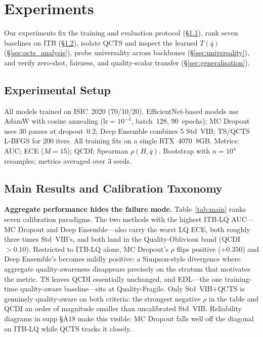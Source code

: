 \documentclass{bmvc2k}
\newcommand{\qbar}{\bar{q}}
\begin{document}
\section{Experiments}
\label{sec:experiments}

Our experiments fix the training and evaluation protocol (\S\ref{sec:setup}), rank seven baselines on ITB (\S\ref{sec:main_results}), isolate QCTS and inspect the learned $T(\qbar)$ (\S\ref{sec:qcts_analysis}), probe universality across backbones (\S\ref{sec:universality}), and verify zero-shot, fairness, and quality-scalar transfer (\S\ref{sec:generalisation}).

\subsection{Experimental Setup}
\label{sec:setup}

All models trained on ISIC~2020 (70/10/20). EfficientNet-based models use AdamW with cosine annealing ($\text{lr}{=}10^{-4}$, batch~128, 90~epochs); MC Dropout uses 30 passes at dropout~0.2; Deep Ensemble combines 5 Std~VIB; TS/QCTS L-BFGS for 200 iters. All training fits on a single RTX~4070~8GB. Metrics: AUC; ECE ($M{=}15$); QCDI; Spearman $\rho(H,\qbar)$. Bootstrap with $n{=}10^4$ resamples; metrics averaged over 3 seeds.

\subsection{Main Results and Calibration Taxonomy}
\label{sec:main_results}

\textbf{Aggregate performance hides the failure mode.}
Table~\ref{tab:main} ranks seven calibration paradigms. The two methods with the highest ITB-LQ AUC---MC Dropout and Deep Ensemble---also carry the worst LQ ECE, both roughly three times Std~VIB's, and both land in the Quality-Oblivious band (QCDI${>}0.10$). Restricted to ITB-LQ alone, MC Dropout's $\rho$ flips positive ($+0.350$) and Deep Ensemble's becomes mildly positive: a Simpson-style divergence where aggregate quality-awareness disappears precisely on the stratum that motivates the metric. TS leaves QCDI essentially unchanged, and EDL---the one training-time quality-aware baseline---sits at Quality-Fragile. Only Std~VIB$+$QCTS is genuinely quality-aware on both criteria: the strongest negative $\rho$ in the table and QCDI an order of magnitude smaller than uncalibrated Std~VIB. Reliability diagrams in supp \S A18 make this visible: MC Dropout falls well off the diagonal on ITB-LQ while QCTS tracks it closely.
\end{document}
